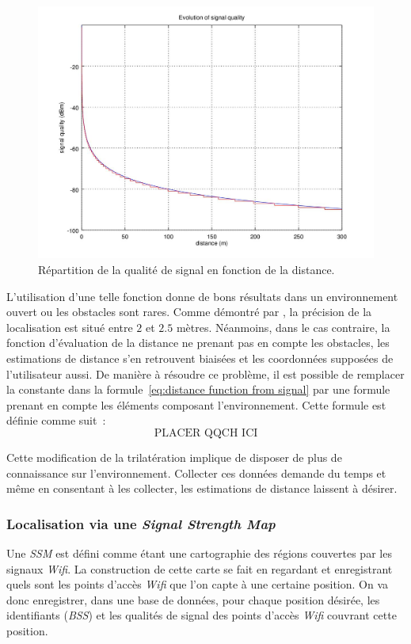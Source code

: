 \documentclass[10pt,journal,compsoc]{IEEEtran}
\begin{document}
      \begin{figure}
        \includegraphics[scale=0.4]{images/signal-propagation.jpg}
        \caption{Répartition de la qualité de signal en fonction de la distance.}
      \end{figure}

	  L'utilisation d'une telle fonction donne de bons résultats dans un environnement ouvert ou les obstacles sont rares. Comme démontré par \cite{Roumanie},
	  la précision de la localisation est situé entre $2$ et $2.5$ mètres. Néanmoins, dans le cas contraire, la fonction d'évaluation de la distance ne prenant
	  pas en compte les obstacles, les estimations de distance s'en retrouvent biaisées et les coordonnées supposées de l'utilisateur aussi. De manière à résoudre
	  ce problème, il est possible de remplacer la constante dans la formule~\eqref{eq:distance function from signal} par une formule prenant en compte les éléments
	  composant l'environnement. Cette formule est définie comme suit~:
      \begin{equation}
        \text{PLACER QQCH ICI}
      \end{equation}

	  Cette modification de la trilatération implique de disposer de plus de connaissance sur l'environnement. Collecter ces données demande du temps et même en
	  consentant à les collecter, les estimations de distance laissent à désirer.

    \subsubsection{Localisation via une \textit{Signal Strength Map}}
      Une \textit{SSM} est défini comme étant une cartographie des régions couvertes par les signaux \textit{Wifi}. La construction de cette carte se fait en regardant
	  et enregistrant quels sont les points d'accès \textit{Wifi} que l'on capte à une certaine position. On va donc enregistrer, dans une base de données, pour chaque
	  position désirée, les identifiants (\textit{BSS}) et les qualités de signal des points d'accès \textit{Wifi} couvrant cette position.
\end{document}
